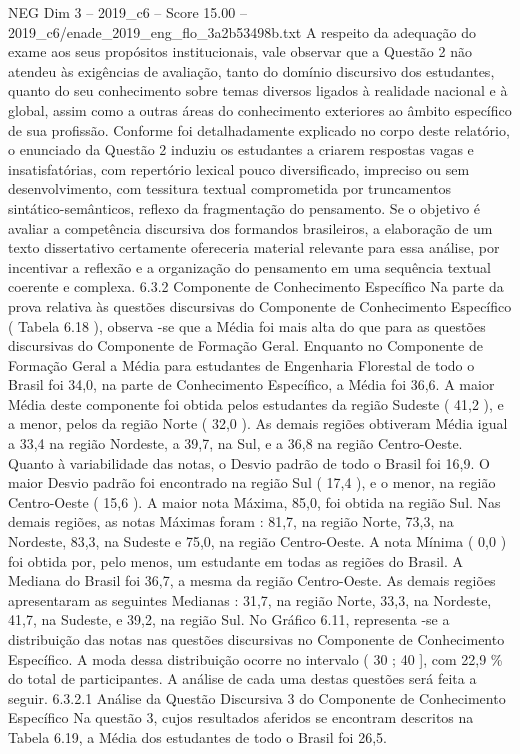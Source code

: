 \begin{textsample}{NEG Dim 3 – 2019\_c6 – Score 15.00 – 2019\_c6/enade\_2019\_eng\_flo\_3a2b53498b.txt}
A respeito da adequação do exame aos seus propósitos institucionais, vale observar que a Questão 2 não atendeu às exigências de avaliação, tanto do domínio discursivo dos estudantes, quanto do seu conhecimento sobre temas diversos ligados à realidade nacional e à global, assim como a outras áreas do conhecimento exteriores ao âmbito específico de sua profissão.
Conforme foi detalhadamente explicado no corpo deste relatório, o enunciado da Questão 2 induziu os estudantes a criarem respostas vagas e insatisfatórias, com repertório lexical pouco diversificado, impreciso ou sem desenvolvimento, com tessitura textual comprometida por truncamentos sintático-semânticos, reflexo da fragmentação do pensamento.
Se o objetivo é avaliar a competência discursiva dos formandos brasileiros, a elaboração de um texto dissertativo certamente ofereceria material relevante para essa análise, por incentivar a reflexão e a organização do pensamento em uma sequência textual coerente e complexa. 6.3.2 Componente de Conhecimento Específico Na parte da prova relativa às questões discursivas do Componente de Conhecimento Específico ( Tabela 6.18 ), observa -se que a Média foi mais alta do que para as questões discursivas do Componente de Formação Geral.
Enquanto no Componente de Formação Geral a Média para estudantes de Engenharia Florestal de todo o Brasil foi 34,0, na parte de Conhecimento Específico, a Média foi 36,6.
A maior Média deste componente foi obtida pelos estudantes da região Sudeste ( 41,2 ), e a menor, pelos da região Norte ( 32,0 ).
As demais regiões obtiveram Média igual a 33,4 na região Nordeste, a 39,7, na Sul, e a 36,8 na região Centro-Oeste.
Quanto à variabilidade das notas, o Desvio padrão de todo o Brasil foi 16,9.
O maior Desvio padrão foi encontrado na região Sul ( 17,4 ), e o menor, na região Centro-Oeste ( 15,6 ).
A maior nota Máxima, 85,0, foi obtida na região Sul.
Nas demais regiões, as notas Máximas foram : 81,7, na região Norte, 73,3, na Nordeste, 83,3, na Sudeste e 75,0, na região Centro-Oeste.
A nota Mínima ( 0,0 ) foi obtida por, pelo menos, um estudante em todas as regiões do Brasil.
A Mediana do Brasil foi 36,7, a mesma da região Centro-Oeste.
As demais regiões apresentaram as seguintes Medianas : 31,7, na região Norte, 33,3, na Nordeste, 41,7, na Sudeste, e 39,2, na região Sul.
No Gráfico 6.11, representa -se a distribuição das notas nas questões discursivas no Componente de Conhecimento Específico.
A moda dessa distribuição ocorre no intervalo ( 30 ; 40 ], com 22,9 \% do total de participantes.
A análise de cada uma destas questões será feita a seguir. 6.3.2.1 Análise da Questão Discursiva 3 do Componente de Conhecimento Específico Na questão 3, cujos resultados aferidos se encontram descritos na Tabela 6.19, a Média dos estudantes de todo o Brasil foi 26,5.

\end{textsample}
